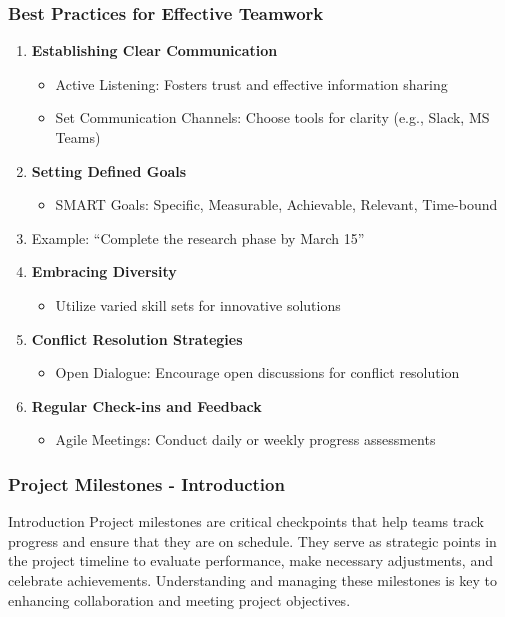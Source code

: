 \documentclass[aspectratio=169]{beamer}
\begin{document}
\begin{frame}[fragile]
    \frametitle{Best Practices for Effective Teamwork}
    
    \begin{enumerate}
        \item \textbf{Establishing Clear Communication}
            \begin{itemize}
                \item Active Listening: Fosters trust and effective information sharing
                \item Set Communication Channels: Choose tools for clarity (e.g., Slack, MS Teams)
            \end{itemize}
        \item \textbf{Setting Defined Goals}
            \begin{itemize}
                \item SMART Goals: Specific, Measurable, Achievable, Relevant, Time-bound
            \end{itemize}
            \pause
            \item Example: “Complete the research phase by March 15”
        
        \item \textbf{Embracing Diversity}
            \begin{itemize}
                \item Utilize varied skill sets for innovative solutions
            \end{itemize}
        
        \item \textbf{Conflict Resolution Strategies}
            \begin{itemize}
                \item Open Dialogue: Encourage open discussions for conflict resolution
            \end{itemize}
        
        \item \textbf{Regular Check-ins and Feedback}
            \begin{itemize}
                \item Agile Meetings: Conduct daily or weekly progress assessments
            \end{itemize}
    \end{enumerate}
\end{frame}

\begin{frame}[fragile]
    \frametitle{Project Milestones - Introduction}
    \begin{block}{Introduction}
        Project milestones are critical checkpoints that help teams track progress and ensure that they are on schedule. They serve as strategic points in the project timeline to evaluate performance, make necessary adjustments, and celebrate achievements. Understanding and managing these milestones is key to enhancing collaboration and meeting project objectives.
    \end{block}
\end{frame}
\end{document}
